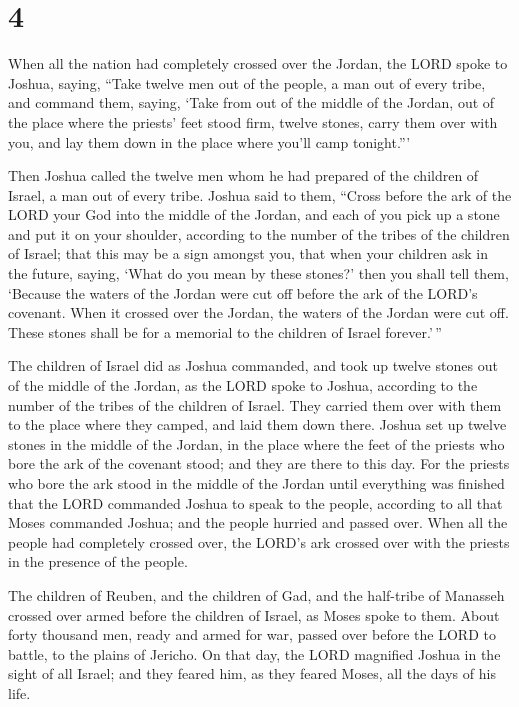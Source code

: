 \hypertarget{section-3}{%
\section{4}\label{section-3}}

 When all the nation had completely crossed over the Jordan,
the LORD spoke to Joshua, saying,  ``Take twelve men out of
the people, a man out of every tribe,  and command them,
saying, `Take from out of the middle of the Jordan, out of the place
where the priests' feet stood firm, twelve stones, carry them over with
you, and lay them down in the place where you'll camp tonight.'''

 Then Joshua called the twelve men whom he had prepared of
the children of Israel, a man out of every tribe.  Joshua
said to them, ``Cross before the ark of the LORD your God into the
middle of the Jordan, and each of you pick up a stone and put it on your
shoulder, according to the number of the tribes of the children of
Israel;  that this may be a sign amongst you, that when your
children ask in the future, saying, `What do you mean by these stones?'
 then you shall tell them, `Because the waters of the Jordan
were cut off before the ark of the LORD's covenant. When it crossed over
the Jordan, the waters of the Jordan were cut off. These stones shall be
for a memorial to the children of Israel forever.'\,''

 The children of Israel did as Joshua commanded, and took up
twelve stones out of the middle of the Jordan, as the LORD spoke to
Joshua, according to the number of the tribes of the children of Israel.
They carried them over with them to the place where they camped, and
laid them down there.  Joshua set up twelve stones in the
middle of the Jordan, in the place where the feet of the priests who
bore the ark of the covenant stood; and they are there to this day.
 For the priests who bore the ark stood in the middle of
the Jordan until everything was finished that the LORD commanded Joshua
to speak to the people, according to all that Moses commanded Joshua;
and the people hurried and passed over.  When all the
people had completely crossed over, the LORD's ark crossed over with the
priests in the presence of the people.

 The children of Reuben, and the children of Gad, and the
half-tribe of Manasseh crossed over armed before the children of Israel,
as Moses spoke to them.  About forty thousand men, ready
and armed for war, passed over before the LORD to battle, to the plains
of Jericho.  On that day, the LORD magnified Joshua in the
sight of all Israel; and they feared him, as they feared Moses, all the
days of his life.

